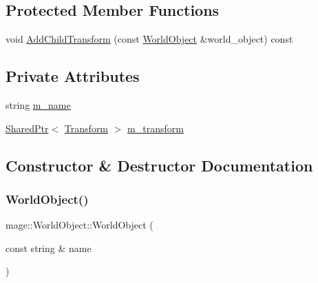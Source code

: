\subsection*{Protected Member Functions}
\begin{DoxyCompactItemize}
\item 
void \hyperlink{classmage_1_1_world_object_a5c66de01e9b83c4c1fa6cd64e17443ee}{Add\+Child\+Transform} (const \hyperlink{classmage_1_1_world_object}{World\+Object} \&world\+\_\+object) const
\end{DoxyCompactItemize}
\subsection*{Private Attributes}
\begin{DoxyCompactItemize}
\item 
string \hyperlink{classmage_1_1_world_object_a383cc5e1275f389459021a16b958049c}{m\+\_\+name}
\item 
\hyperlink{namespacemage_a1e01ae66713838a7a67d30e44c67703e}{Shared\+Ptr}$<$ \hyperlink{structmage_1_1_transform}{Transform} $>$ \hyperlink{classmage_1_1_world_object_a599102e219249b46e1cf60c98efd559c}{m\+\_\+transform}
\end{DoxyCompactItemize}


\subsection{Constructor \& Destructor Documentation}
\hypertarget{classmage_1_1_world_object_a40d714ae9da1e197171c55f8fd321cc4}{}\label{classmage_1_1_world_object_a40d714ae9da1e197171c55f8fd321cc4} 
\subsubsection{\texorpdfstring{World\+Object()}{WorldObject()}\hspace{0.1cm}{\footnotesize\ttfamily [1/2]}}
{\footnotesize\ttfamily mage\+::\+World\+Object\+::\+World\+Object (\begin{DoxyParamCaption}\item[{const string \&}]{name }\end{DoxyParamCaption})}

\hypertarget{classmage_1_1_world_object_a4e7ace41518b45c75d975c766de28143}{}\label{classmage_1_1_world_object_a4e7ace41518b45c75d975c766de28143} 
